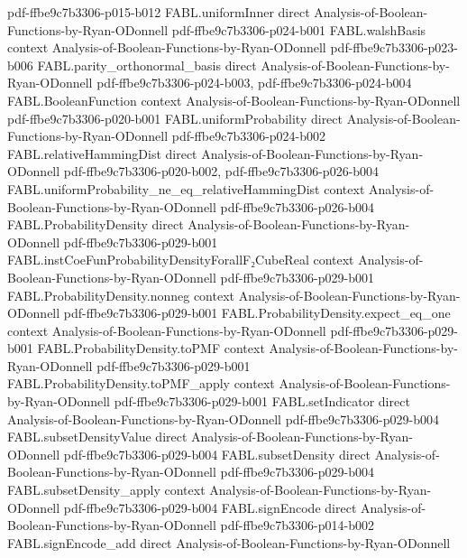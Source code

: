 \begin{theorem}
  {pdf-ffbe9c7b3306-p015-b012}
\proofstep
  {FABL.uniformInner}
  {direct}
  {Analysis-of-Boolean-Functions-by-Ryan-ODonnell}
  {pdf-ffbe9c7b3306-p024-b001}
\proofstep
  {FABL.walshBasis}
  {context}
  {Analysis-of-Boolean-Functions-by-Ryan-ODonnell}
  {pdf-ffbe9c7b3306-p023-b006}
\proofstep
  {FABL.parity_orthonormal_basis}
  {direct}
  {Analysis-of-Boolean-Functions-by-Ryan-ODonnell}
  {pdf-ffbe9c7b3306-p024-b003,
    pdf-ffbe9c7b3306-p024-b004}
\proofstep
  {FABL.BooleanFunction}
  {context}
  {Analysis-of-Boolean-Functions-by-Ryan-ODonnell}
  {pdf-ffbe9c7b3306-p020-b001}
\proofstep
  {FABL.uniformProbability}
  {direct}
  {Analysis-of-Boolean-Functions-by-Ryan-ODonnell}
  {pdf-ffbe9c7b3306-p024-b002}
\proofstep
  {FABL.relativeHammingDist}
  {direct}
  {Analysis-of-Boolean-Functions-by-Ryan-ODonnell}
  {pdf-ffbe9c7b3306-p020-b002,
    pdf-ffbe9c7b3306-p026-b004}
\proofstep
  {FABL.uniformProbability_ne_eq_relativeHammingDist}
  {context}
  {Analysis-of-Boolean-Functions-by-Ryan-ODonnell}
  {pdf-ffbe9c7b3306-p026-b004}
\proofstep
  {FABL.ProbabilityDensity}
  {direct}
  {Analysis-of-Boolean-Functions-by-Ryan-ODonnell}
  {pdf-ffbe9c7b3306-p029-b001}
\proofstep
  {FABL.instCoeFunProbabilityDensityForallF₂CubeReal}
  {context}
  {Analysis-of-Boolean-Functions-by-Ryan-ODonnell}
  {pdf-ffbe9c7b3306-p029-b001}
\proofstep
  {FABL.ProbabilityDensity.nonneg}
  {context}
  {Analysis-of-Boolean-Functions-by-Ryan-ODonnell}
  {pdf-ffbe9c7b3306-p029-b001}
\proofstep
  {FABL.ProbabilityDensity.expect_eq_one}
  {context}
  {Analysis-of-Boolean-Functions-by-Ryan-ODonnell}
  {pdf-ffbe9c7b3306-p029-b001}
\proofstep
  {FABL.ProbabilityDensity.toPMF}
  {context}
  {Analysis-of-Boolean-Functions-by-Ryan-ODonnell}
  {pdf-ffbe9c7b3306-p029-b001}
\proofstep
  {FABL.ProbabilityDensity.toPMF_apply}
  {context}
  {Analysis-of-Boolean-Functions-by-Ryan-ODonnell}
  {pdf-ffbe9c7b3306-p029-b001}
\proofstep
  {FABL.setIndicator}
  {direct}
  {Analysis-of-Boolean-Functions-by-Ryan-ODonnell}
  {pdf-ffbe9c7b3306-p029-b004}
\proofstep
  {FABL.subsetDensityValue}
  {direct}
  {Analysis-of-Boolean-Functions-by-Ryan-ODonnell}
  {pdf-ffbe9c7b3306-p029-b004}
\proofstep
  {FABL.subsetDensity}
  {direct}
  {Analysis-of-Boolean-Functions-by-Ryan-ODonnell}
  {pdf-ffbe9c7b3306-p029-b004}
\proofstep
  {FABL.subsetDensity_apply}
  {context}
  {Analysis-of-Boolean-Functions-by-Ryan-ODonnell}
  {pdf-ffbe9c7b3306-p029-b004}
\proofstep
  {FABL.signEncode}
  {direct}
  {Analysis-of-Boolean-Functions-by-Ryan-ODonnell}
  {pdf-ffbe9c7b3306-p014-b002}
\proofstep
  {FABL.signEncode_add}
  {direct}
  {Analysis-of-Boolean-Functions-by-Ryan-ODonnell}

\end{theorem}

